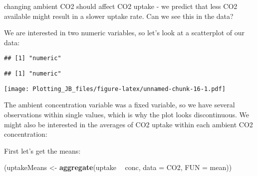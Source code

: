 \documentclass[]{article}
\newenvironment{Shaded}{\begin{snugshade}}{\end{snugshade}}
\newcommand{\DataTypeTok}[1]{\textcolor[rgb]{0.13,0.29,0.53}{#1}}
\newcommand{\KeywordTok}[1]{\textcolor[rgb]{0.13,0.29,0.53}{\textbf{#1}}}
\newcommand{\NormalTok}[1]{#1}
\newcommand{\OperatorTok}[1]{\textcolor[rgb]{0.81,0.36,0.00}{\textbf{#1}}}
\newcommand{\StringTok}[1]{\textcolor[rgb]{0.31,0.60,0.02}{#1}}
\begin{document}
changing ambient CO2 should affect CO2 uptake - we predict that less CO2
available might result in a slower uptake rate. Can we see this in the
data?

We are interested in two numeric variables, so let's look at a
scatterplot of our data:

\begin{Shaded}
\end{Shaded}

\begin{verbatim}
## [1] "numeric"
\end{verbatim}

\begin{Shaded}
\end{Shaded}

\begin{verbatim}
## [1] "numeric"
\end{verbatim}

\begin{Shaded}
\end{Shaded}

\texttt{[image: Plotting\_JB\_files/figure-latex/unnamed-chunk-16-1.pdf]}

The ambient concentration variable was a fixed variable, so we have
several observations within single values, which is why the plot looks
discontinuous. We might also be interested in the averages of CO2 uptake
within each ambient CO2 concentration:

First let's get the means:

\begin{Shaded}
\begin{Highlighting}[]
\NormalTok{(uptakeMeans <-}\StringTok{ }\KeywordTok{aggregate}\NormalTok{(uptake }\OperatorTok{~}\StringTok{ }\NormalTok{conc, }\DataTypeTok{data =}\NormalTok{ CO2, }\DataTypeTok{FUN =}\NormalTok{ mean))}
\end{Highlighting}
\end{Shaded}
\end{document}
